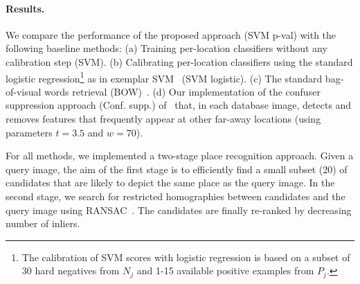   \paragraph{Results.}
      We compare the performance of the proposed approach (SVM p-val) with the following baseline methods: (a) Training per-location classifiers without any calibration step (SVM). (b) Calibrating per-location classifiers using the standard logistic regression\footnote
         {
         The calibration of SVM scores with logistic regression is based on a subset of 30 hard negatives from $N_j$ and 1-15 available positive examples from $P_j$.
         } 
      as in exemplar SVM~\cite{Malisiewicz11} (SVM logistic). (c) The standard bag-of-visual words retrieval (BOW)~\cite{Philbin07}. (d) Our implementation of the confuser suppression  approach (Conf. supp.) of~\cite{Knopp2010} that, in each database image, detects and removes features that frequently appear at other far-away locations (using parameters $t=3.5$ and $w=70$).

      For all methods, we implemented a two-stage place recognition approach. Given a query image, the aim of the first stage is to efficiently find a small subset (20) of candidates that are likely to depict the same place as the query image. In the second stage, we search for restricted homographies between candidates and the query image using RANSAC~\cite{Philbin07}. The candidates are finally re-ranked by decreasing number of inliers.

